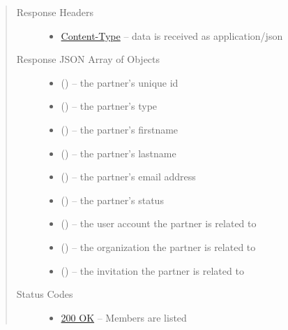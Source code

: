 \documentclass[letterpaper,10pt,english]{sphinxmanual}
\begin{document}
\begin{fulllineitems}
\begin{quote}
\begin{description}
\item[{Response Headers}] \leavevmode\begin{itemize}
\item {} 
\href{http://tools.ietf.org/html/rfc7231\#section-3.1.1.5}{Content-Type} -- data is received as application/json

\end{itemize}

\item[{Response JSON Array of Objects}] \leavevmode\begin{itemize}
\item {} 
 () -- the partner's unique id

\item {} 
 () -- the partner's type

\item {} 
 () -- the partner's firstname

\item {} 
 () -- the partner's lastname

\item {} 
 () -- the partner's email address

\item {} 
 () -- the partner's status

\item {} 
 () -- the user account the partner is related to

\item {} 
 () -- the organization the partner is
related to

\item {} 
 () -- the invitation the partner is related to

\end{itemize}

\item[{Status Codes}] \leavevmode\begin{itemize}
\item {} 
\href{http://www.w3.org/Protocols/rfc2616/rfc2616-sec10.html\#sec10.2.1}{200 OK} -- Members are listed


\end{itemize}
\end{description}
\end{quote}
\end{fulllineitems}
\end{document}
